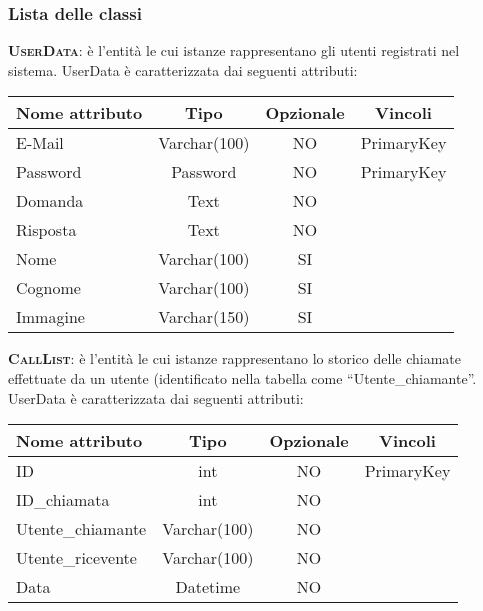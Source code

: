 \subsubsection{Lista delle classi}

\begin{description}
	\item{\scshape\bfseries UserData}: è l'entità le cui istanze rappresentano gli utenti registrati nel sistema. UserData è caratterizzata dai seguenti attributi:

\begin{center}
\begin{tabular}{lccc}
\toprule
Nome attributo & Tipo & Opzionale & Vincoli\\
\midrule %
E-Mail & Varchar(100) & NO & PrimaryKey\\
Password & Password & NO & PrimaryKey\\
Domanda & Text & NO &\\
Risposta & Text & NO &\\
Nome & Varchar(100) & SI &\\
Cognome & Varchar(100) & SI &\\
Immagine & Varchar(150) & SI &\\
\bottomrule
\end{tabular}
\end{center}

	\item{\scshape\bfseries CallList}: è l'entità le cui istanze rappresentano lo storico delle chiamate effettuate da un utente (identificato nella tabella come ``Utente\_chiamante''. UserData è caratterizzata dai seguenti attributi:

\begin{center}
\begin{tabular}{lccc}
\toprule
Nome attributo & Tipo & Opzionale & Vincoli\\
\midrule %
ID & int & NO & PrimaryKey\\
ID\_chiamata & int & NO & \\
Utente\_chiamante & Varchar(100) & NO & \\
Utente\_ricevente & Varchar(100) & NO & \\
Data & Datetime & NO &\\
\bottomrule
\end{tabular}
\end{center}


\end{description}
